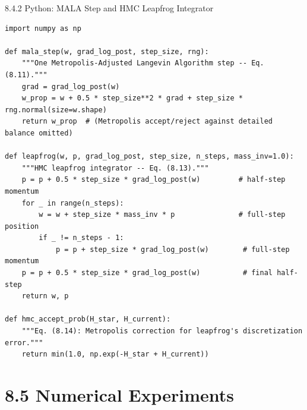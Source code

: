 \documentclass[aspectratio=169,10pt]{beamer}
\begin{document}
\begin{frame}[fragile]{8.4.2 Python: MALA Step and HMC Leapfrog Integrator}
\begin{lstlisting}
import numpy as np

def mala_step(w, grad_log_post, step_size, rng):
    """One Metropolis-Adjusted Langevin Algorithm step -- Eq. (8.11)."""
    grad = grad_log_post(w)
    w_prop = w + 0.5 * step_size**2 * grad + step_size * rng.normal(size=w.shape)
    return w_prop  # (Metropolis accept/reject against detailed balance omitted)

def leapfrog(w, p, grad_log_post, step_size, n_steps, mass_inv=1.0):
    """HMC leapfrog integrator -- Eq. (8.13)."""
    p = p + 0.5 * step_size * grad_log_post(w)         # half-step momentum
    for _ in range(n_steps):
        w = w + step_size * mass_inv * p               # full-step position
        if _ != n_steps - 1:
            p = p + step_size * grad_log_post(w)        # full-step momentum
    p = p + 0.5 * step_size * grad_log_post(w)          # final half-step
    return w, p

def hmc_accept_prob(H_star, H_current):
    """Eq. (8.14): Metropolis correction for leapfrog's discretization error."""
    return min(1.0, np.exp(-H_star + H_current))
\end{lstlisting}
\end{frame}

\section{8.5 Numerical Experiments}
\end{document}
